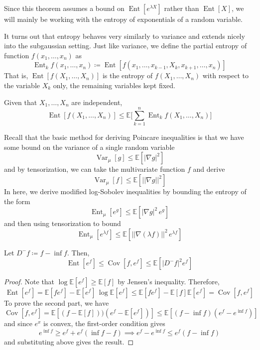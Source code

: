 \documentclass{article}
\DeclareMathOperator{\Ent}{Ent}
\DeclareMathOperator{\Cov}{Cov}
\DeclareMathOperator{\Var}{Var}
\begin{document}
  Since this theorem assumes a bound on $\Ent[e^{\lambda X}]$ rather than $\Ent[X]$, we will mainly be working with the entropy of exponentials of a random variable. 

  It turns out that entropy behaves very similarly to variance and extends nicely into the subgaussian setting. Just like variance, we define the partial entropy of function $f(x_1, \ldots, x_n)$ as 
  \[\Ent_k f (x_1, \ldots, x_n) \coloneqq \Ent[ f(x_1, \ldots, x_{k-1}, X_k , x_{k+1}, \ldots, x_n)]\]
  That is, $\Ent[f(X_1, \ldots, X_n)]$ is the entropy of $f(X_1, \ldots, X_n)$ with respect to the variable $X_k$ only, the remaining variables kept fixed. 

  \begin{theorem}
  Given that $X_1, \ldots, X_n$ are independent, 
  \[\Ent[ f(X_1, \ldots, X_n)] \leq \mathbb{E} \bigg[ \sum_{k=1}^n \Ent_k f (X_1, \ldots, X_n) \bigg]\]
  \end{theorem}

  Recall that the basic method for deriving Poincare inequalities is that we have some bound on the variance of a single random variable 
  \[\Var_\mu [g] \leq \mathbb{E}[|\nabla g|^2]\]
  and by tensorization, we can take the multivariate function $f$ and derive 
  \[\Var_\mu [f] \leq \mathbb{E}[ ||\nabla g||^2 ]\]
  In here, we derive modified log-Sobolev inequalities by bounding the entropy of the form 
  \[\Ent_\mu [e^g] \leq \mathbb{E}[ |\nabla g|^2 \, e^g ]\]
  and then using tensorization to bound 
  \[\Ent_\mu [e^{\lambda f}] \leq \mathbb{E} [ ||\nabla (\lambda f)||^2 \, e^{\lambda f} ]\]

  \begin{lemma}
  Let $D^- f \coloneqq f - \inf f$. Then, 
  \[\Ent[e^f] \leq \Cov[f, e^f] \leq \mathbb{E}[|D^- f|^2 e^f]\]
  \end{lemma}
  \begin{proof}
  Note that $\log \mathbb{E}[e^f] \geq \mathbb{E}[f]$ by Jensen's inequality. Therefore, 
  \[\Ent[e^f] = \mathbb{E}[f e^f] - \mathbb{E}[e^f] \, \log \mathbb{E}[e^f] \leq \mathbb{E}[f e^f] - \mathbb{E}[f] \mathbb{E}[e^f] = \Cov[f, e^f]\]
  To prove the second part, we have 
  \[\Cov[f, e^f] = \mathbb{E}[(f - \mathbb{E}[f]))(e^f - \mathbb{E}[e^f])] \leq \mathbb{E}[(f - \inf f)(e^f - e^{\inf f})] \]
  and since $e^x$ is convex, the first-order condition gives 
  \[e^{\inf f} \geq e^f + e^f (\inf f - f) \implies e^f - e^{\inf f} \leq e^f (f - \inf f)\]
  and substituting above gives the result. 
  \end{proof}
\end{document}

